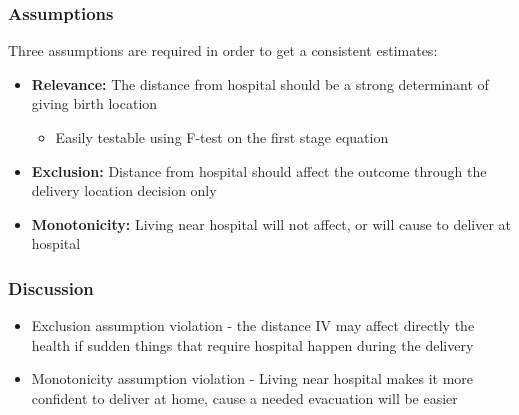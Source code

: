 \documentclass{beamer}
\begin{document}
\begin{frame}
  \frametitle{Assumptions}
  Three assumptions are required in order to get a consistent estimates:
  \begin{itemize}
    \item \textbf{Relevance:} The distance from hospital should be a strong determinant of giving birth location
    \begin{itemize}
      \item Easily testable using F-test on the first stage equation
    \end{itemize}
    \item \textbf{Exclusion:} Distance from hospital should affect the outcome through the delivery location decision only
    \item \textbf{Monotonicity:} Living near hospital will not affect, or will cause to deliver at hospital
  \end{itemize}
  \end{frame}

\begin{frame}
\frametitle{Discussion}
\begin{itemize}
\item Exclusion assumption violation - the distance IV may affect directly the health if sudden things that require hospital happen during the delivery
\item Monotonicity assumption violation - Living near hospital makes it more confident to deliver at home, cause a needed evacuation will be easier
\end{itemize}
\end{frame}
\end{document}
